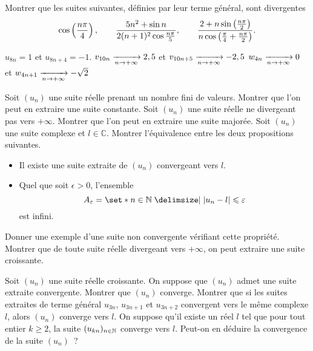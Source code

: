 \documentclass{magnolia}
\begin{document}

Montrer que les suites suivantes, définies par leur terme général, sont
divergentes
\[\cos\left(\frac{n\pi}{4}\right), \qquad \frac{5n^2+\sin n}{2(n+1)^2 \cos\frac{n\pi}{5}},
  \qquad
  \frac{2+n\sin\left(\frac{n\pi}{2}\right)}{n\cos\left(\frac{\pi}{4}+\frac{n\pi}{2}\right)}.\]
  
  \begin{sol}
  \begin{questions}
  \question $u_{8n}=1$ et $u_{8n+4}=-1$.
  \question $v_{10n}\xrightarrow[n\rightarrow +\infty]{}2,5$ et $v_{10n+5}\xrightarrow[n\rightarrow +\infty]{}-2,5$
  \question $w_{4n}\xrightarrow[n\rightarrow +\infty]{}0$ et $w_{4n+1}\xrightarrow[n\rightarrow +\infty]{}-\sqrt{2}$
  \end{questions}
  \end{sol}


  \begin{questions}
  \question Soit $(u_n)$ une suite réelle prenant un nombre fini de valeurs.
    Montrer que l'on peut en extraire une suite constante.
  \question Soit $(u_n)$ une suite réelle ne divergeant pas vers $+\infty$.
    Montrer que l'on peut en extraire une suite majorée.
  \question Soit $(u_n)$ une suite complexe et $l\in \mathbb{C}$. Montrer
    l'équivalence entre les deux propositions suivantes.
  \begin{itemize}
  \item Il existe une suite extraite de $(u_n)$ convergeant vers $l$.
  \item Quel que soit $\epsilon > 0$, l'ensemble
    \[A_\epsilon=\enstq{n \in \N}{|u_n-l|\leq \epsilon}\]
    est infini.
  \end{itemize}
  Donner une exemple d'une suite non convergente vérifiant cette propriété.
\question Montrer que de toute suite réelle divergeant vers $+\infty$, on peut
  extraire une suite croissante.
\end{questions}

\begin{questions}
\question Soit $(u_n)$ une suite réelle croissante. On suppose que $(u_n)$ admet une
  suite extraite convergente. Montrer que $(u_n)$ converge.
\question Montrer que si les suites extraites de terme général $u_{3n}$,
  $u_{3n+1}$ et $u_{3n+2}$ convergent vers le même complexe $l$, alors $(u_n)$
  converge vers $l$.
\question On suppose qu'il existe un réel $l$ tel que pour tout entier
  $k\geq 2$, la suite $(u_{kn})_{n\in\mathbb{N}}$ converge vers $l$.
  Peut-on en déduire la convergence de la suite $(u_n)$~?
\end{questions}
\end{document}
